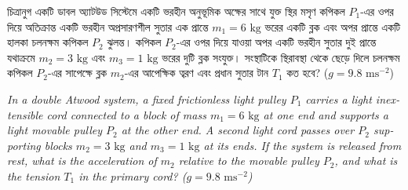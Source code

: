 \documentclass[12pt, a4paper]{article}
\begin{document}
\begin{tcolorbox}[questionbox={প্রশ্ন (Question) 8}]
    \noindent
    চিত্রানুগ একটি ডাবল অ্যাটউড সিস্টেমে একটি ভরহীন অনুভূমিক অক্ষের সাথে যুক্ত স্থির মসৃণ কপিকল $P_1$-এর ওপর দিয়ে অতিক্রান্ত একটি ভরহীন অপ্রসারণশীল সুতার এক প্রান্তে $m_1 = 6\text{ kg}$ ভরের একটি ব্লক এবং অপর প্রান্তে একটি হালকা চলনক্ষম কপিকল $P_2$ ঝুলন্ত। কপিকল $P_2$-এর ওপর দিয়ে যাওয়া অপর একটি ভরহীন সুতার দুই প্রান্তে যথাক্রমে $m_2 = 3\text{ kg}$ এবং $m_3 = 1\text{ kg}$ ভরের দুটি ব্লক সংযুক্ত। সংস্থাটিকে স্থিরাবস্থা থেকে ছেড়ে দিলে চলনক্ষম কপিকল $P_2$-এর সাপেক্ষে ব্লক $m_2$-এর আপেক্ষিক ত্বরণ এবং প্রধান সুতার টান $T_1$ কত হবে? ($g = 9.8\text{ ms}^{-2}$)
    
    \vspace{0.8em}
    \begin{english}
    \noindent\textit{\color{darkgray}
    In a double Atwood system, a fixed frictionless light pulley $P_1$ carries a light inextensible cord connected to a block of mass $m_1 = 6\text{ kg}$ at one end and supports a light movable pulley $P_2$ at the other end. A second light cord passes over $P_2$ supporting blocks $m_2 = 3\text{ kg}$ and $m_3 = 1\text{ kg}$ at its ends. If the system is released from rest, what is the acceleration of $m_2$ relative to the movable pulley $P_2$, and what is the tension $T_1$ in the primary cord? ($g = 9.8\text{ ms}^{-2}$)
    }
    \end{english}
\end{tcolorbox}
\end{document}
